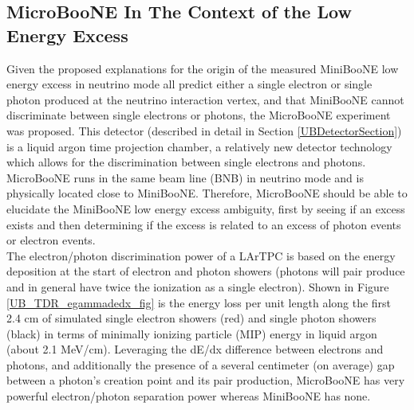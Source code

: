 \subsection{MicroBooNE In The Context of the Low Energy Excess}

Given the proposed explanations for the origin of the measured MiniBooNE low energy excess in neutrino mode all predict either a single electron or single photon produced at the neutrino interaction vertex, and that MiniBooNE cannot discriminate between single electrons or photons, the MicroBooNE experiment was proposed. This detector (described in detail in Section \ref{UBDetectorSection}) is a liquid argon time projection chamber, a relatively new detector technology which allows for the discrimination between single electrons and photons. MicroBooNE runs in the same beam line (BNB) in neutrino mode and is physically located close to MiniBooNE. Therefore, MicroBooNE should be able to elucidate the MiniBooNE low energy excess ambiguity, first by seeing if an excess exists and then determining if the excess is related to an excess of photon events or electron events.\\

The electron/photon discrimination power of a LArTPC is based on the energy deposition at the start of electron and photon showers (photons will pair produce and in general have twice the ionization as a single electron). Shown in Figure \ref{UB_TDR_egammadedx_fig} is the energy loss per unit length along the first 2.4 cm of simulated single electron showers (red) and single photon showers (black) in terms of minimally ionizing particle (MIP) energy in liquid argon (about 2.1 MeV/cm). Leveraging the dE/dx difference between electrons and photons, and additionally the presence of a several centimeter (on average) gap between a photon's creation point and its pair production, MicroBooNE has very powerful electron/photon separation power whereas MiniBooNE has none.\\

